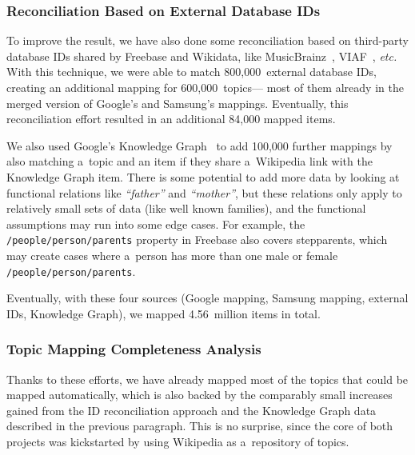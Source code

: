 \documentclass{sig-alternate-2013}
\begin{document}
\subsubsection{Reconciliation Based on External Database IDs}

To improve the result, we have also done some reconciliation based on third-party database IDs
shared by Freebase and Wikidata, like MusicBrainz~\cite{musicbrainz},
VIAF~\cite{viaf}, \emph{etc.}
With this technique, we were able to match 800,000~external database IDs,
creating an additional mapping for 600,000~topics---%
most of them already in the merged version of Google's and Samsung's mappings.
Eventually, this reconciliation effort resulted in an additional 84,000 mapped items.

We also used Google's Knowledge Graph~\cite{singhal2012} to add 100,000 further mappings
by also matching a~topic and an item if they share a~Wikipedia link with the Knowledge Graph item.
There is some potential to add more data by looking at functional relations
like \textit{``father''} and \textit{``mother''},
but these relations only apply to relatively small sets of data
(like well known families), and the functional assumptions may run into some edge cases.
For example, the \texttt{/people/person/parents} property in Freebase also covers stepparents,
which may create cases where a~person has more than one male or female \texttt{/people/person/parents}.

Eventually, with these four sources (Google mapping, Samsung mapping, external IDs, Knowledge Graph),
we mapped 4.56~million items in total.

\subsubsection{Topic Mapping Completeness Analysis}

Thanks to these efforts, we have already mapped most of the topics that could be mapped automatically,
which is also backed by the comparably small increases gained from the ID reconciliation approach
and the Knowledge Graph data described in the previous paragraph.
This is no surprise, since the core of both projects was kickstarted by using
Wikipedia as a~repository of topics.
\end{document}
